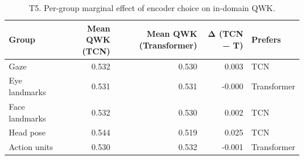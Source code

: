 \begin{table}
\caption{T5. Per-group marginal effect of encoder choice on in-domain QWK.}
\label{tab:T5_group_marginal}
\begin{tabular}{lrrrl}
\toprule
Group & Mean QWK (TCN) & Mean QWK (Transformer) & Δ (TCN − T) & Prefers \\
\midrule
Gaze & 0.532 & 0.530 & 0.003 & TCN \\
Eye landmarks & 0.531 & 0.531 & -0.000 & Transformer \\
Face landmarks & 0.532 & 0.530 & 0.002 & TCN \\
Head pose & 0.544 & 0.519 & 0.025 & TCN \\
Action units & 0.530 & 0.532 & -0.001 & Transformer \\
\bottomrule
\end{tabular}
\end{table}
